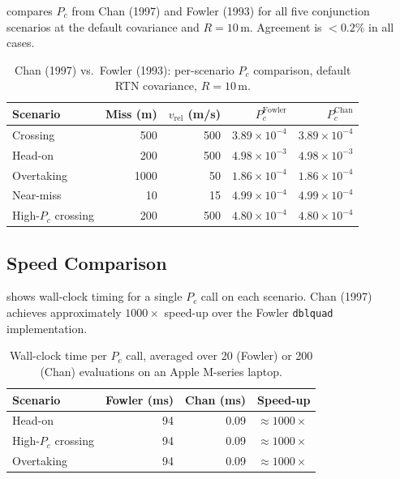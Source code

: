 \documentclass[11pt]{article}
\begin{document}
 compares $P_c$ from Chan (1997) and Fowler (1993)
for all five conjunction scenarios at the default covariance and $R = 10$\,m.
Agreement is $< 0.2\%$ in all cases.

\begin{table}[htb]
\centering
\caption{Chan (1997) vs.\ Fowler (1993): per-scenario $P_c$ comparison,
         default RTN covariance, $R = 10$\,m.}
\label{tab:chan_validation}
\begin{tabular}{lrrrr}
  \toprule
  Scenario & Miss (m) & $v_\text{rel}$ (m/s)
            & $P_c^\text{Fowler}$ & $P_c^\text{Chan}$ \\
  \midrule
  Crossing        & 500  & 500  & $3.89 \times 10^{-4}$ & $3.89 \times 10^{-4}$ \\
  Head-on         & 200  & 500  & $4.98 \times 10^{-3}$ & $4.98 \times 10^{-3}$ \\
  Overtaking      & 1000 & 50   & $1.86 \times 10^{-4}$ & $1.86 \times 10^{-4}$ \\
  Near-miss       & 10   & 15   & $4.99 \times 10^{-4}$ & $4.99 \times 10^{-4}$ \\
  High-$P_c$ crossing & 200 & 500 & $4.80 \times 10^{-4}$ & $4.80 \times 10^{-4}$ \\
  \bottomrule
\end{tabular}
\end{table}

\subsection{Speed Comparison}

 shows wall-clock timing for a single $P_c$ call on each
scenario.  Chan (1997) achieves approximately $1000\times$ speed-up over the
Fowler \texttt{dblquad} implementation.

\begin{table}[htb]
\centering
\caption{Wall-clock time per $P_c$ call, averaged over 20 (Fowler) or 200
         (Chan) evaluations on an Apple M-series laptop.}
\label{tab:chan_speed}
\begin{tabular}{lrrl}
  \toprule
  Scenario & Fowler (ms) & Chan (ms) & Speed-up \\
  \midrule
  Head-on         & 94 & 0.09 & $\approx 1000\times$ \\
  High-$P_c$ crossing & 94 & 0.09 & $\approx 1000\times$ \\
  Overtaking      & 94 & 0.09 & $\approx 1000\times$ \\
  \bottomrule
\end{tabular}
\end{table}
\end{document}
